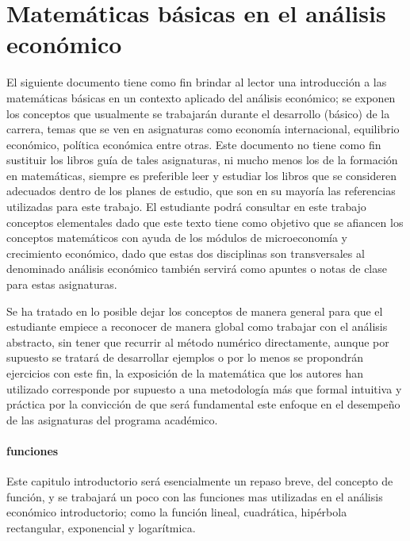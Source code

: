 \documentclass[12pt]{article}
\begin{document}
\part*{Matemáticas básicas en el análisis económico}


El siguiente documento tiene como fin brindar al lector una introducción a las matemáticas básicas en un contexto aplicado del análisis económico; se exponen los conceptos que usualmente se  trabajarán durante el desarrollo (básico) de la carrera, temas que se ven  en asignaturas como  economía internacional, equilibrio económico, política económica entre otras. Este  documento no  tiene como fin sustituir los libros guía de tales asignaturas, ni mucho menos los de  la formación en matemáticas, siempre es preferible leer y estudiar los libros que se  consideren adecuados dentro de los planes de estudio, que son en su mayoría las referencias utilizadas para este trabajo. El estudiante podrá consultar en este trabajo  conceptos elementales dado que este texto tiene como objetivo que se afiancen los conceptos matemáticos con ayuda de los módulos de microeconomía y crecimiento económico,  dado que estas dos disciplinas son transversales al denominado análisis económico también servirá como apuntes o notas de clase  para estas asignaturas.

Se ha tratado en lo posible dejar los conceptos de manera general para que el estudiante empiece a reconocer de manera global como trabajar con el análisis abstracto, sin tener que recurrir al método numérico directamente, aunque por supuesto se tratará de desarrollar ejemplos o por lo menos se propondrán  ejercicios con este fin, la exposición de la matemática que los autores han utilizado corresponde por supuesto a una metodología más que formal intuitiva y práctica por la convicción de que será fundamental este enfoque en el desempeño de las asignaturas del programa académico.

\newpage

\subsection{funciones}

Este capitulo introductorio será esencialmente un repaso breve, del concepto de función, y se trabajará un poco con las funciones mas utilizadas en el análisis económico introductorio; como la función lineal, cuadrática, hipérbola rectangular, exponencial y logarítmica. 

\\
\end{document}
